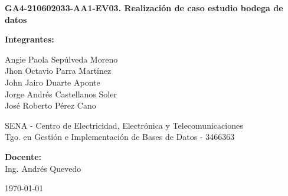 	\begin{titlepage}
		\centering
		
		{\Large\bfseries GA4-210602033-AA1-EV03. Realización de caso estudio bodega de datos \par}
		
		\vspace{5.5cm}
		
		{\large \textbf{Integrantes:} \par}
		\vspace{0.3cm}
		Angie Paola Sepúlveda Moreno \\
		Jhon Octavio Parra Martínez \\
		John Jairo Duarte Aponte \\
		Jorge Andrés Castellanos Soler \\
		José Roberto Pérez Cano \\
		
		\vfill
		
		SENA - Centro de Electricidad, Electrónica y Telecomunicaciones \\
		Tgo. en Gestión e Implementación de Bases de Datos - 3466363 \\
		
		\vspace{1cm}
		
		\textbf{Docente:} \\
		Ing. Andrés Quevedo \\
		
		\vspace{1.5cm}
		
		\today \par
		
	\end{titlepage}
	
	\newpage
	\tableofcontents
	\newpage
	\doublespacing
